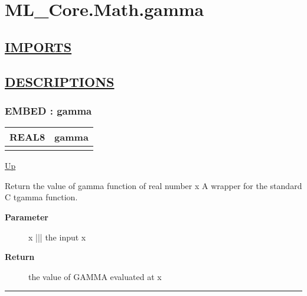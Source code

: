 \chapter*{ML\_Core.Math.gamma}
\hypertarget{ecldoc:toc:ML_Core.Math.gamma}{}

\section*{\underline{IMPORTS}}

\section*{\underline{DESCRIPTIONS}}
\subsection*{EMBED : gamma}
\hypertarget{ecldoc:ml_core.math.gamma}{}

{\renewcommand{\arraystretch}{1.5}
\begin{tabularx}{\textwidth}{|>{\raggedright\arraybackslash}l|X|}
\hline
\hspace{0pt}REAL8 & gamma \\
\hline
\multicolumn{2}{|>{\raggedright\arraybackslash}X|}{\hspace{0pt}(REAL8 x)} \\
\hline
\end{tabularx}
}

\hyperlink{ecldoc:toc:ML_Core/Math}{Up}

\par
Return the value of gamma function of real number x A wrapper for the standard C tgamma function.

\par
\begin{description}
\item [\textbf{Parameter}] x ||| the input x
\item [\textbf{Return}] the value of GAMMA evaluated at x
\end{description}

\rule{\textwidth}{0.4pt}

